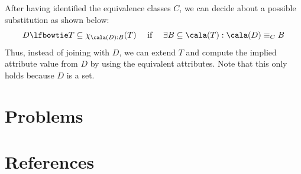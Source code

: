 \documentclass[11pt]{article}
\begin{document}
After having identified the equivalence classes \(C\), we can decide about a possible substitution as
shown below:
\begin{equation*}
D\lfbowtie T\subseteq\chi_{\cala(D):B}(T)\quad\text{ if }\quad
\exists B\subseteq\cala(T):\cala(D)\equiv_CB
\end{equation*}
Thus, instead of joining with \(D\), we can extend \(T\) and compute the implied attribute value from
\(D\) by using the equivalent attributes. Note that this only holds because \(D\) is a set.
\section{Problems}
\label{sec:orgd9d48e4}


\section{References}
\label{sec:orgd06bc5e}
\label{bibliographystyle link}


\label{bibliography link}

\end{document}
